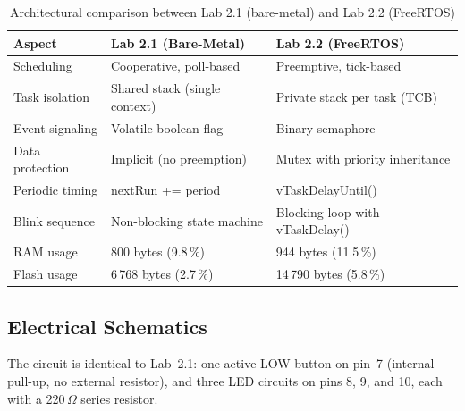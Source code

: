 \begin{table}[H]
\centering
\small
\begin{tabular}{|l|l|l|}
\hline
\textbf{Aspect} & \textbf{Lab 2.1 (Bare-Metal)} & \textbf{Lab 2.2 (FreeRTOS)} \\
\hline
Scheduling & Cooperative, poll-based & Preemptive, tick-based \\
\hline
Task isolation & Shared stack (single context) & Private stack per task (TCB) \\
\hline
Event signaling & Volatile boolean flag & Binary semaphore \\
\hline
Data protection & Implicit (no preemption) & Mutex with priority inheritance \\
\hline
Periodic timing & nextRun += period & vTaskDelayUntil() \\
\hline
Blink sequence & Non-blocking state machine & Blocking loop with vTaskDelay() \\
\hline
RAM usage & 800 bytes (9.8\,\%) & 944 bytes (11.5\,\%) \\
\hline
Flash usage & 6\,768 bytes (2.7\,\%) & 14\,790 bytes (5.8\,\%) \\
\hline
\end{tabular}
\caption{Architectural comparison between Lab 2.1 (bare-metal) and Lab 2.2 (FreeRTOS)}
\label{tab:comparison}
\end{table}

\subsection{Electrical Schematics}

The circuit is identical to Lab~2.1: one active-LOW button on pin~7 (internal pull-up, no external resistor), and three LED circuits on pins 8, 9, and 10, each with a 220\,$\Omega$ series resistor.


